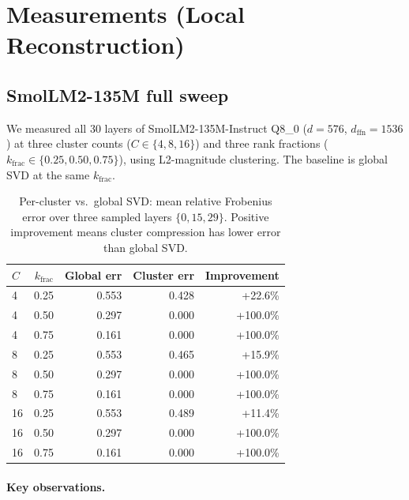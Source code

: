\documentclass[11pt]{article}
\begin{document}
\section{Measurements (Local Reconstruction)}
\label{sec:measurements}

\subsection{SmolLM2-135M full sweep}

We measured all 30 layers of SmolLM2-135M-Instruct Q8\_0 ($d{=}576$,
$d_\text{ffn}{=}1536$) at three cluster counts ($C\in\{4,8,16\}$)
and three rank fractions ($k_\text{frac}\in\{0.25,0.50,0.75\}$),
using L2-magnitude clustering.  The baseline is global SVD at the same
$k_\text{frac}$.

\begin{table}[h]\centering\small
\caption{Per-cluster vs.\ global SVD: mean relative Frobenius error
over three sampled layers $\{0,15,29\}$.  Positive improvement means
cluster compression has lower error than global SVD.}
\label{tab:ffn-cluster}
\begin{tabular}{@{}lrrrr@{}}
\toprule
$C$ & $k_\text{frac}$ & Global err & Cluster err & Improvement \\
\midrule
4  & 0.25 & 0.553 & 0.428 & +22.6\% \\
4  & 0.50 & 0.297 & 0.000 & +100.0\% \\
4  & 0.75 & 0.161 & 0.000 & +100.0\% \\
8  & 0.25 & 0.553 & 0.465 & +15.9\% \\
8  & 0.50 & 0.297 & 0.000 & +100.0\% \\
8  & 0.75 & 0.161 & 0.000 & +100.0\% \\
16 & 0.25 & 0.553 & 0.489 & +11.4\% \\
16 & 0.50 & 0.297 & 0.000 & +100.0\% \\
16 & 0.75 & 0.161 & 0.000 & +100.0\% \\
\bottomrule
\end{tabular}
\end{table}

\paragraph{Key observations.}
\end{document}
